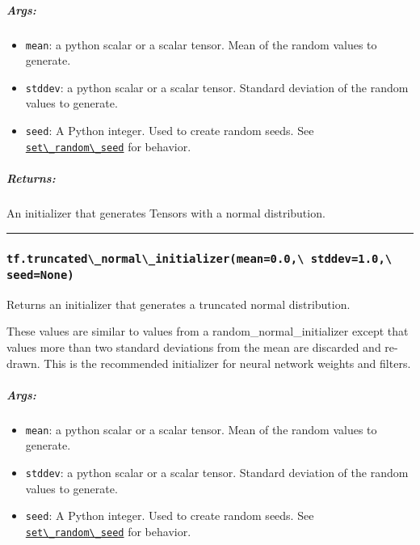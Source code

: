 \subparagraph{Args: }\label{args-19}

\begin{itemize}
\tightlist
\item
  \lstinline{mean}: a python scalar or a scalar tensor. Mean of the random
  values to generate.
\item
  \lstinline{stddev}: a python scalar or a scalar tensor. Standard
  deviation of the random values to generate.
\item
  \lstinline{seed}: A Python integer. Used to create random seeds. See
  \href{../../api_docs/python/constant_op.md\#set_random_seed}{\lstinline{set\_random\_seed}}
  for behavior.
\end{itemize}

\subparagraph{Returns: }\label{returns-21}

An initializer that generates Tensors with a normal distribution.

\begin{center}\rule{0.5\linewidth}{\linethickness}\end{center}

\subsubsection{\texorpdfstring{\lstinline{tf.truncated\_normal\_initializer(mean=0.0,\ stddev=1.0,\ seed=None)}
}{tf.truncated\_normal\_initializer(mean=0.0, stddev=1.0, seed=None) }}\label{tf.truncatedux5fnormalux5finitializermean0.0-stddev1.0-seednone}

Returns an initializer that generates a truncated normal distribution.

These values are similar to values from a random\_normal\_initializer
except that values more than two standard deviations from the mean are
discarded and re-drawn. This is the recommended initializer for neural
network weights and filters.

\subparagraph{Args: }\label{args-20}

\begin{itemize}
\tightlist
\item
  \lstinline{mean}: a python scalar or a scalar tensor. Mean of the random
  values to generate.
\item
  \lstinline{stddev}: a python scalar or a scalar tensor. Standard
  deviation of the random values to generate.
\item
  \lstinline{seed}: A Python integer. Used to create random seeds. See
  \href{../../api_docs/python/constant_op.md\#set_random_seed}{\lstinline{set\_random\_seed}}
  for behavior.
\end{itemize}

